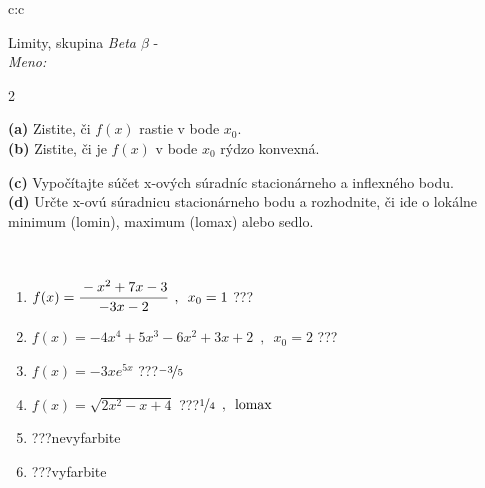 \documentclass[10pt]{report}
\begin{document}
\begin{tabular}{c:c}
\begin{minipage}[c][104.5mm][t]{0.5\linewidth}
\begin{center}
\vspace{7mm}
{\huge Limity, skupina \textit{Beta $\beta$} -}\\[5mm]
\textit{Meno:}\phantom{xxxxxxxxxxxxxxxxxxxxxxxxxxxxxxxxxxxxxxxxxxxxxxxxxxxxxxxxxxxxxxxxx}\\[5mm]
\begin{minipage}{0.95\linewidth}
\begin{center}
{\small \begin{multicols}{2} \raggedright
\textbf{(a)} Zistite, či \(f(x)\) rastie v bode \(x_0\). \\[1mm]
\textbf{(b)} Zistite, či je \(f(x)\) v bode \(x_0\) rýdzo konvexná. \par \columnbreak
\textbf{(c)} Vypočítajte súčet x-ových súradníc stacionárneho a inflexného bodu. \\[1mm]
\textbf{(d)} Určte x-ovú súradnicu stacionárneho bodu a rozhodnite, či ide o lokálne minimum (lomin), maximum (lomax) alebo sedlo. \\[1mm]
\end{multicols}
}
\end{center}
\end{minipage}
\\[4mm]
\begin{minipage}{0.79\linewidth}
\begin{center}
\begin{varwidth}{\linewidth}
\begin{enumerate}
\normalsize
\item $f(x)=\cfrac{-x^2+7x-3}{-3x-2}\enspace , \enspace x_0=1$\quad \dotfill\; ???\;\dotfill \quad {}
\item $f(x)=-4x^4+5x^3-6x^2+3x+2\enspace , \enspace x_0=2$\quad \dotfill\; ???\;\dotfill \quad {}
\item $f(x)=-3xe^{5x}$\quad \dotfill\; ???\;\dotfill \quad $\nicefrac{-3}{5}$
\item $f(x)=\sqrt{2x^2-x+4}$\quad \dotfill\; ???\;\dotfill \quad $\nicefrac{1}{4}\enspace , \enspace\text{lomax}$
\item \quad \dotfill\; ???\;\dotfill \quad nevyfarbite
\item \quad \dotfill\; ???\;\dotfill \quad vyfarbite
\end{enumerate}
\end{varwidth}
\end{center}

\end{minipage}
\end{center}
\end{minipage}
\end{tabular}
\end{document}
